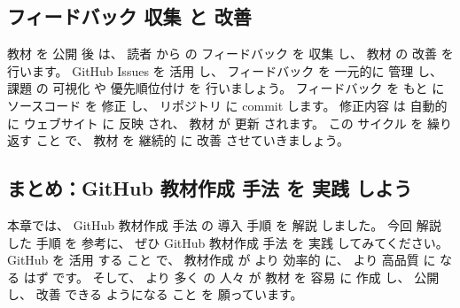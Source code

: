 \subsection{ フィードバック 収集 と 改善}

 教材 を 公開 後 は、 読者 から の フィードバック を 収集 し、 教材 の 改善 を 行います。
GitHub Issues を 活用 し、 フィードバック を 一元的に 管理 し、 課題 の 可視化 や 優先順位付け を 行いましょう。
 フィードバック を もと に ソースコード を 修正 し、 リポジトリ に commit します。
修正内容 は 自動的 に ウェブサイト に 反映 され、 教材 が 更新 されます。
この サイクル を 繰り返す こと で、 教材 を 継続的 に 改善 させていきましょう。

\subsection{ まとめ：GitHub 教材作成 手法 を 実践 しよう}

本章では、 GitHub 教材作成 手法 の 導入 手順 を 解説 しました。
今回 解説 した 手順 を 参考に、 ぜひ GitHub 教材作成 手法 を 実践 してみてください。
GitHub を 活用 する こと で、 教材作成 が より 効率的 に、 より 高品質 に なる はず です。
そして、 より 多く の 人々 が 教材 を 容易 に 作成 し、 公開 し、 改善 できる ようになる こと を 願っています。
